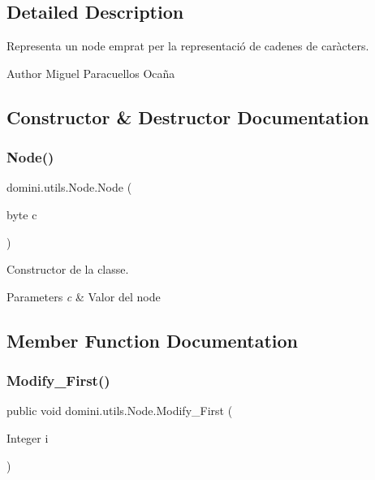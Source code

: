 \subsection{Detailed Description}
Representa un node emprat per la representació de cadenes de caràcters. 

\begin{DoxyAuthor}{Author}
Miguel Paracuellos Ocaña 
\end{DoxyAuthor}


\subsection{Constructor \& Destructor Documentation}
\mbox{\label{classdomini_1_1utils_1_1Node_ae337ba617322158f0ac240c900350278}} 
\subsubsection{\texorpdfstring{Node()}{Node()}}
{\footnotesize\ttfamily domini.\+utils.\+Node.\+Node (\begin{DoxyParamCaption}\item[{byte}]{c }\end{DoxyParamCaption})\hspace{0.3cm}{\ttfamily [inline]}}



Constructor de la classe. 


\begin{DoxyParams}{Parameters}
{\em c} & Valor del node \\
\hline
\end{DoxyParams}


\subsection{Member Function Documentation}
\mbox{\label{classdomini_1_1utils_1_1Node_a3fe2e958308c90d24607a4e191680089}} 
\subsubsection{\texorpdfstring{Modify\+\_\+\+First()}{Modify\_First()}}
{\footnotesize\ttfamily public void domini.\+utils.\+Node.\+Modify\+\_\+\+First (\begin{DoxyParamCaption}\item[{Integer}]{i }\end{DoxyParamCaption})\hspace{0.3cm}{\ttfamily [inline]}}




